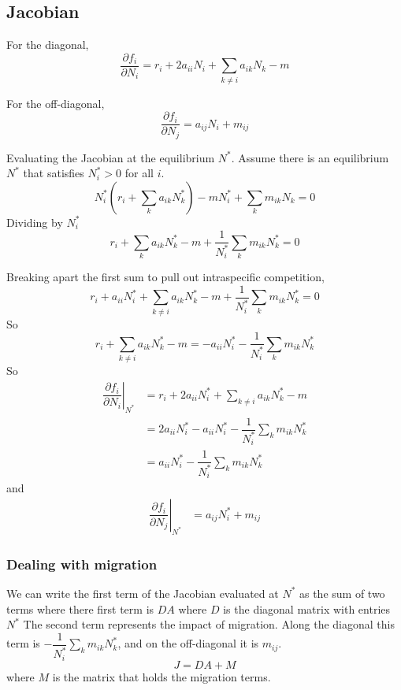 \documentclass{article}
\begin{document}
\subsection*{Jacobian}
For the diagonal,
\begin{equation}
\dfrac{\partial f_i}{\partial N_i} = r_i + 2a_{ii}N_i + \sum_{k \neq i} a_{ik}N_k - m 
\end{equation}

For the off-diagonal,
\begin{equation}
\dfrac{\partial f_i}{\partial N_j} = a_{ij} N_i + m_{ij}
\end{equation}

Evaluating the Jacobian at the equilibrium $N^*$. Assume there is an equilibrium $N^*$ that satisfies $N^*_i>0$ for all $i$.
\begin{equation}
    N^*_i\left(r_i+\sum_k a_{ik}N^*_k\right)-mN^*_i+\sum_k m_{ik}N_k=0
\end{equation}
Dividing by $N_i^*$
\begin{equation}
r_i+\sum_k a_{ik}N^*_k-m+\dfrac{1}{N^*_i}\sum_k m_{ik}N^*_k=0
\end{equation}

Breaking apart the first sum to pull out intraspecific competition,
\begin{equation}
    r_i+a_{ii}N_i^* + \sum_{k \neq i} a_{ik}N^*_k-m+\dfrac{1}{N^*_i}\sum_k m_{ik}N^*_k=0
\end{equation}
So
\begin{equation}
    r_i+\sum_{k \neq i} a_{ik}N^*_k-m=-a_{ii}N_i^* - \dfrac{1}{N^*_i}\sum_k m_{ik}N^*_k
\end{equation}
So
\begin{align}
    \left.\dfrac{\partial f_i}{\partial N_i} \right \rvert_{N^*} 
    &= r_i + 2a_{ii} N^*_i + \sum_{k\neq i} a_{ik}N^*_k - m \\
    &= 2a_{ii}N^*_i-a_{ii}N_i^* - \dfrac{1}{N^*_i}\sum_k m_{ik}N^*_k \\
    &= a_{ii}N^*_i - \dfrac{1}{N^*_i}\sum_k m_{ik}N^*_k
\end{align}
and
\begin{align}
    \left.\dfrac{\partial f_i}{\partial N_j} \right \rvert_{N^*} 
    &= a_{ij} N^*_i + m_{ij}
\end{align}

\subsubsection*{Dealing with migration}
We can write the first term of the Jacobian evaluated at $N^*$ as the sum of two terms where there first term is $D A$ where $D$ is the diagonal matrix with entries $N^*$ The second term represents the impact of migration. Along the diagonal this term is $- \dfrac{1}{N^*_i}\sum_k m_{ik}N^*_k$, and on the off-diagonal it is $m_{ij}$.
\begin{equation}
J = DA + M
\end{equation}
where $M$ is the matrix that holds the migration terms.
\end{document}
